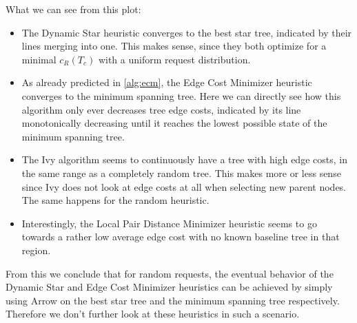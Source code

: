 \documentclass[a4paper, oneside]{discothesis}
\begin{document}

What we can see from this plot:
\begin{itemize}
\item The Dynamic Star heuristic converges to the best star tree, indicated by their lines merging into one. This makes sense, since they both optimize for a minimal $c_R(T_c)$ with a uniform request distribution.
\item As already predicted in \autoref{alg:ecm}, the Edge Cost Minimizer heuristic converges to the minimum spanning tree. Here we can directly see how this algorithm only ever decreases tree edge costs, indicated by its line monotonically decreasing until it reaches the lowest possible state of the minimum spanning tree.
\item The Ivy algorithm seems to continuously have a tree with high edge costs, in the same range as a completely random tree. This makes more or less sense since Ivy does not look at edge costs at all when selecting new parent nodes. The same happens for the random heuristic.
\item Interestingly, the Local Pair Distance Minimizer heuristic seems to go towards a rather low average edge cost with no known baseline tree in that region.
\end{itemize}

From this we conclude that for random requests, the eventual behavior of the Dynamic Star and Edge Cost Minimizer heuristics can be achieved by simply using Arrow on the best star tree and the minimum spanning tree respectively. Therefore we don't further look at these heuristics in such a scenario.
\end{document}
